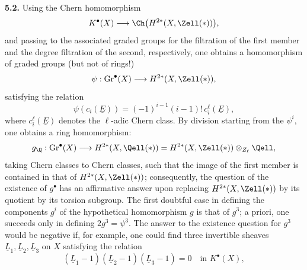 \textbf{5.2.} Using the Chern homomorphism
\[
 K^\bullet(X)\longrightarrow\Ch\bigl(H^{2*}(X,\Zell(*))\bigr),
\]
and passing to the associated graded groups for the filtration of the first member and the degree filtration of the second, respectively, one obtains a homomorphism of graded groups (but not of rings!)
\[
 \psi:\operatorname{Gr}^\bullet(X)\longrightarrow H^{2*}(X,\Zell(*)),
\]
satisfying the relation
\[
 \psi(c_i(\underline{E}))=(-1)^{i-1}(i-1)!\,c_i^\ell(\underline{E}),
\]
where $c_i^\ell(\underline{E})$ denotes the $\ell$-adic Chern class. By division starting from the $\psi^i$, one obtains a ring homomorphism:
\[
 g_\Q:\operatorname{Gr}^\bullet(X)\longrightarrow
 H^{2*}(X,\Qell(*))=
 H^{2*}(X,\Zell(*))\otimes_{Z_\ell}\Qell,
\]
taking Chern classes to Chern classes, such that the image of the first member is contained in that of $H^{2*}(X,\Zell(*))$; consequently, the question of the existence of $g^\bullet$ has an affirmative answer upon replacing $H^{2*}(X,\Zell(*))$ by its quotient by its torsion subgroup. The first doubtful case in defining the components $g^i$ of the hypothetical homomorphism $g$ is that of $g^3$; a priori, one succeeds only in defining $2g^3=\psi^3$. The answer to the existence question for $g^3$ would be negative if, for example, one could find three invertible sheaves $\underline{L}_1,\underline{L}_2,\underline{L}_3$ on $X$ satisfying the relation
\[
 (\underline{L}_1-1)(\underline{L}_2-1)(\underline{L}_3-1)=0\quad\text{in }K^\bullet(X),
\]
